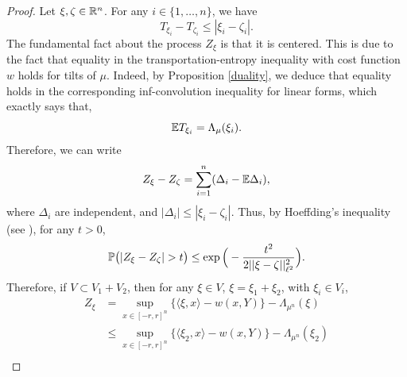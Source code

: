 \documentclass[a4paper,oneside,11pt]{article}
\begin{document}
\begin{proof}
Let $\xi,\zeta \in \mathbb{R}^n$.  For any $i\in\{1,\ldots,n\}$, we have
$$  T_{\xi_i}-T_{\zeta_i} \leq  |\xi_i- \zeta_i|.$$
The fundamental fact about the process $Z_\xi$ is that it is centered. This is due to the fact that equality in the transportation-entropy inequality with cost function $w$ holds for tilts of $\mu$. Indeed, by Proposition \ref{duality}, we deduce that equality holds in the corresponding inf-convolution inequality for linear forms, which exactly says that,
$$ \mathbb{E} T_{\xi_i} = \Lambda_\mu(\xi_i).$$
Therefore, we can write
 $$Z_{\xi} - Z_{\zeta} = \sum_{i=1}^n (\Delta_i - \mathbb{E}\Delta_i),$$
where $\Delta_i$ are independent, and $| \Delta_i| \leq |\xi_i - \zeta_i|$. Thus, by Hoeffding's inequality (see \cite[Theorem 2.8]{BLM}), for any $t>0$,
\begin{equation} \label{incre} \mathbb{P}\big( |Z_\xi - Z_\zeta| >t \big) \leq \exp\Big( - \frac{t^2}{2 ||\xi - \zeta ||_{\ell^2}^2}\Big).\end{equation}
Therefore, if $V\subset V_1 +V_2$, then for any $\xi \in V$, $\xi = \xi_{1} + \xi_2$, with $\xi_i \in V_i$, 
\begin{align*}
 Z_{\xi}& = \sup_{x \in [-r,r]^n}\{ \langle\xi,x \rangle -w(x,Y) \} -\Lambda_{\mu^n}(\xi)\\
& \leq  \sup_{x \in [-r,r]^n}\{ \langle\xi_2,x \rangle -w(x,Y) \} -\Lambda_{\mu^n}(\xi_2)\\

\end{align*}
\end{proof}
\end{document}
